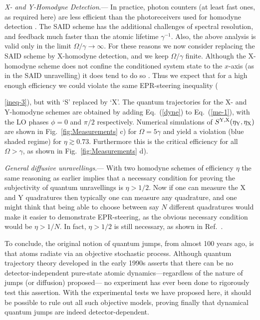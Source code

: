 \documentclass[12pt,prl,floatfix,showpacs,superscriptaddress,amsmath,amssymb]{revtex4}
\newcommand{\erf}[1]{Eq.~(\ref{#1})}
\renewcommand{\(}{\left(}
\renewcommand{\)}{\right)}
\renewcommand{\section}[1]{{\em #1}.---}
\begin{document}
\section{X- and Y-Homodyne Detection} In practice, photon counters (at least fast ones, as required here) are less efficient than the photoreceivers used for homodyne detection \cite{WisMil10}. The SAID scheme has the additional challenges of spectral resolution, and feedback much faster than the atomic lifetime $\gamma^{-1}$. Also, the above analysis is valid only in the limit $\Omega / \gamma \to \infty$. For these reasons we now consider replacing the SAID scheme by X-homodyne detection, and we keep $\Omega/\gamma$ finite. Although the X-homodyne scheme does not confine the conditioned system state to the $x$-axis (as in the SAID unravelling) it does tend to do so \cite{WisMil93c,WisMil10}. Thus we expect that for a high enough efficiency we could violate the same EPR-steering inequality ({\ref{ineq-3}),  but with `S' replaced by `X'.
The quantum trajectories for the X- and Y-homodyne schemes are obtained by adding \erf{dyne} to \erf{me-1}, with the LO phases $\phi = 0$ and $\pi/2$ respectively.  Numerical simulations of $S^{\rm Y, X}(\eta_{\rm Y},\eta_{\rm X})$ are shown in Fig.~\ref{fig:Measurements} c) for $\Omega = 5\gamma$ and yield a violation (blue shaded regime) for $\eta \gtrsim 0.73$.  Furthermore this is the critical efficiency for all $\Omega >\gamma$, as shown in Fig.~\ref{fig:Measurements} d).

\section{General diffusive unravellings} With two homodyne schemes of efficiency $\eta$ the same reasoning as earlier implies that a necessary condition for proving the  subjectivity of quantum unravellings is $\eta>1/2$. Now if one can measure the X and Y quadratures then typically one can measure any quadrature, and one might think that being able to choose between say $N$ different quadratures would make it easier to demonstrate EPR-steering, as the obvious necessary condition would be $\eta  > 1/N$. In fact,  $\eta>1/2$ is still necessary,  as shown in Ref.~\cite{epaps}. 

To conclude, the original notion of quantum jumps, from almost 100 years ago, is that atoms radiate via an objective stochastic process. Although quantum trajectory theory developed in the early 1990s asserts that there can be no detector-independent pure-state 
atomic dynamics---regardless of the nature of jumps (or diffusion) proposed---
no experiment has ever been done to rigorously test this assertion. 
With the experimental tests we have proposed here,
 it should be possible to rule out all such objective models, proving finally that dynamical quantum jumps are indeed detector-dependent. 

}
\end{document}
